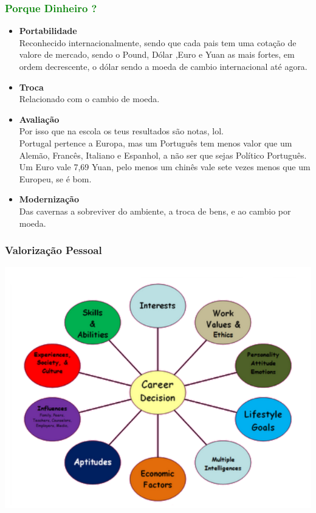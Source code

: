 \begin{frame}
\frametitle{\textcolor{green}{Porque Dinheiro ?}}
\begin{itemize}
	\item \textbf{Portabilidade} \\
	Reconhecido internacionalmente, sendo que cada pais tem uma cotação de valore de mercado, sendo o Pound, Dólar ,Euro e Yuan as mais fortes, em ordem decrescente, o dólar sendo a moeda de cambio internacional até agora.
	\item \textbf{Troca} \\
	Relacionado com o cambio de moeda.
	\item \textbf{Avaliação} \\
	Por isso que na escola os teus resultados são notas, lol.\\
	Portugal pertence a Europa, mas um Português tem menos valor que um Alemão, Francês, Italiano e Espanhol, a não ser que sejas Político Português.\\Um Euro vale 7,69 Yuan, pelo menos um chinês vale sete vezes menos que um Europeu, se é bom.\\
	\item \textbf{Modernização} \\
	Das cavernas a sobreviver do ambiente, a troca de bens, e ao cambio por moeda.
\end{itemize}
\end{frame}
\begin{frame}
\frametitle{Valorização Pessoal}
\begin{center}
\includegraphics[scale=0.4]{"./image/Career Path/Career Decision Factors"}
\end{center}
\end{frame}
